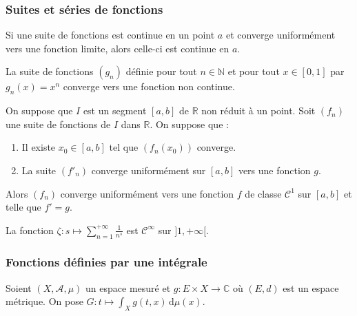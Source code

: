   \subsubsection{Suites et séries de fonctions}


  \begin{proposition}
    Si une suite de fonctions est continue en un point $a$ et converge uniformément vers une fonction limite, alors celle-ci est continue en $a$.
  \end{proposition}

  \begin{cexample}
    La suite de fonctions $(g_n)$ définie pour tout $n \in \mathbb{N}$ et pour tout $x \in [0,1]$ par $g_n(x) = x^n$ converge vers une fonction non continue.
  \end{cexample}

  \begin{proposition}
    On suppose que $I$ est un segment $[a,b]$ de $\mathbb{R}$ non réduit à un point. Soit $(f_n)$ une suite de fonctions de $I$ dans $\mathbb{R}$. On suppose que :
    \begin{enumerate}[label=(\roman*)]
      \item Il existe $x_0 \in [a,b]$ tel que $(f_n(x_0))$ converge.
      \item La suite $(f'_n)$ converge uniformément sur $[a,b]$ vers une fonction $g$.
    \end{enumerate}
    Alors $(f_n)$ converge uniformément vers une fonction $f$ de classe $\mathcal{C}^1$ sur $[a,b]$ et telle que $f'=g$.
  \end{proposition}


  \begin{example}
    La fonction $\zeta : s \mapsto \sum_{n=1}^{+\infty} \frac{1}{n^s}$ est $\mathcal{C}^\infty$ sur $]1,+\infty[$.
  \end{example}

  \subsubsection{Fonctions définies par une intégrale}


  Soient $(X, \mathcal{A}, \mu)$ un espace mesuré et $g : E \times X \rightarrow \mathbb{C}$ où $(E, d)$ est un espace métrique. On pose $G : t \mapsto \int_X g(t, x) \, \mathrm{d}\mu(x)$.

